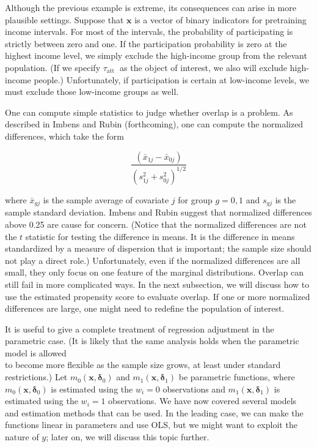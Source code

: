 \documentclass[10pt]{article}
\begin{document}
Although the previous example is extreme, its consequences can arise in more plausible settings. Suppose that $\mathbf{x}$ is a vector of binary indicators for pretraining income intervals. For most of the intervals, the probability of participating is strictly between zero and one. If the participation probability is zero at the highest income level, we simply exclude the high-income group from the relevant population. (If we specify $\tau_{\text {att }}$ as the object of interest, we also will exclude high-income people.) Unfortunately, if participation is certain at low-income levels, we must exclude those low-income groups as well.

One can compute simple statistics to judge whether overlap is a problem. As described in Imbens and Rubin (forthcoming), one can compute the normalized differences, which take the form


\begin{equation*}
\frac{\left(\bar{x}_{1 j}-\bar{x}_{0 j}\right)}{\left(s_{1 j}^{2}+s_{0 j}^{2}\right)^{1 / 2}} \tag{21.29}
\end{equation*}


where $\bar{x}_{g j}$ is the sample average of covariate $j$ for group $g=0,1$ and $s_{g j}$ is the sample standard deviation. Imbens and Rubin suggest that normalized differences above 0.25 are cause for concern. (Notice that the normalized differences are not the $t$ statistic for testing the difference in means. It is the difference in means standardized by a measure of dispersion that is important; the sample size should not play a direct role.) Unfortunately, even if the normalized differences are all small, they only focus on one feature of the marginal distributions. Overlap can still fail in more complicated ways. In the next subsection, we will discuss how to use the estimated propensity score to evaluate overlap. If one or more normalized differences are large, one might need to redefine the population of interest.

It is useful to give a complete treatment of regression adjustment in the parametric case. (It is likely that the same analysis holds when the parametric model is allowed\\
to become more flexible as the sample size grows, at least under standard restrictions.) Let $m_{0}\left(\mathbf{x}, \boldsymbol{\delta}_{0}\right)$ and $m_{1}\left(\mathbf{x}, \boldsymbol{\delta}_{1}\right)$ be parametric functions, where $m_{0}\left(\mathbf{x}, \boldsymbol{\delta}_{0}\right)$ is estimated using the $w_{i}=0$ observations and $m_{1}\left(\mathbf{x}, \boldsymbol{\delta}_{1}\right)$ is estimated using the $w_{i}=1$ observations. We have now covered several models and estimation methods that can be used. In the leading case, we can make the functions linear in parameters and use OLS, but we might want to exploit the nature of $y$; later on, we will discuss this topic further.
\end{document}
